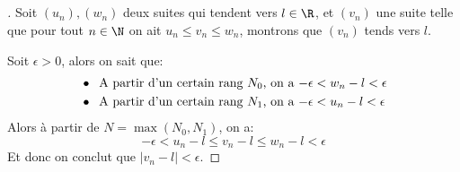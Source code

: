 \documentclass{report}
\begin{document}
   \subsection*{}
   \begin{proof}[\unskip\nopunct]
      Soit \((u_n), (w_n)\) deux suites qui tendent vers \(l \in \R\), et \((v_n)\) une suite telle que pour tout \(n \in \N\) on ait \(u_n \leq v_n \leq w_n\), montrons que \((v_n)\) tends vers \(l\).\<

      Soit \(\epsilon > 0\), alors on sait que:
      \begin{align*}
         &\bullet \;\; \text{A partir d'un certain rang \(N_0\), on a \( -\epsilon < w_n - l < \epsilon\)}\\
         &\bullet \;\; \text{A partir d'un certain rang \(N_1\), on a \(- \epsilon < u_n - l < \epsilon\)}
      \end{align*}
      Alors à partir de \(N = \max(N_0, N_1)\), on a:
      \[
         -\epsilon < u_n - l \leq v_n - l \leq w_n - l < \epsilon
      \]
      Et donc on conclut que \(|v_n - l| < \epsilon\).
      
   \end{proof}
\end{document}
